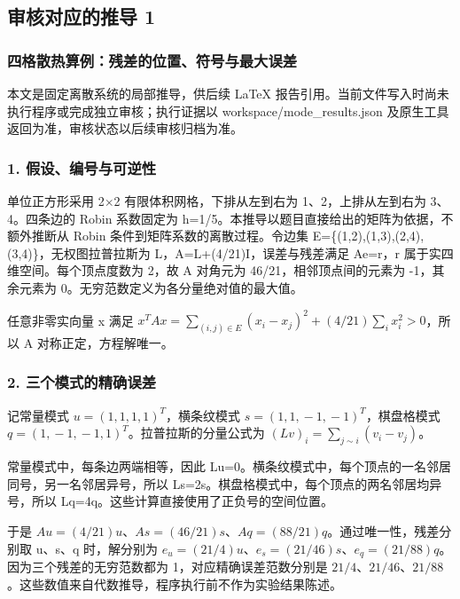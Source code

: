 \documentclass[UTF8,a4paper,11pt]{ctexart}
\begin{document}
\subsection*{审核对应的推导 1}
\subsubsection*{四格散热算例：残差的位置、符号与最大误差}

本文是固定离散系统的局部推导，供后续 LaTeX 报告引用。当前文件写入时尚未执行程序或完成独立审核；执行证据以 workspace/mode\_results.json 及原生工具返回为准，审核状态以后续审核归档为准。

\subsubsection*{1. 假设、编号与可逆性}

单位正方形采用 2\ensuremath{\times }2 有限体积网格，下排从左到右为 1、2，上排从左到右为 3、4。四条边的 Robin 系数固定为 h=1/5。本推导以题目直接给出的矩阵为依据，不额外推断从 Robin 条件到矩阵系数的离散过程。令边集 E=\{(1,2),(1,3),(2,4),(3,4)\}，无权图拉普拉斯为 L，A=L+(4/21)I，误差与残差满足 Ae=r，r 属于实四维空间。每个顶点度数为 2，故 A 对角元为 46/21，相邻顶点间的元素为 -1，其余元素为 0。无穷范数定义为各分量绝对值的最大值。

任意非零实向量 x 满足 \(x^T A x=\sum_{(i,\allowbreak{}j)\in E}(x_i-x_j)^2+(4/21)\sum_i x_i^2>0\)，所以 A 对称正定，方程解唯一。

\subsubsection*{2. 三个模式的精确误差}

记常量模式 \(u=(1,\allowbreak{}1,\allowbreak{}1,\allowbreak{}1)^T\)，横条纹模式 \(s=(1,\allowbreak{}1,\allowbreak{}-1,\allowbreak{}-1)^T\)，棋盘格模式 \(q=(1,\allowbreak{}-1,\allowbreak{}-1,\allowbreak{}1)^T\)。拉普拉斯的分量公式为 \((Lv)_i=\sum_{j\sim i}(v_i-v_j)\)。

常量模式中，每条边两端相等，因此 Lu=0。横条纹模式中，每个顶点的一名邻居同号，另一名邻居异号，所以 Ls=2s。棋盘格模式中，每个顶点的两名邻居均异号，所以 Lq=4q。这些计算直接使用了正负号的空间位置。

于是 \(Au=(4/21)u\)、\(As=(46/21)s\)、\(Aq=(88/21)q\)。通过唯一性，残差分别取 u、s、q 时，解分别为 \(e_u=(21/4)u\)、\(e_s=(21/46)s\)、\(e_q=(21/88)q\)。因为三个残差的无穷范数都为 1，对应精确误差范数分别是 \(21/4\)、\(21/46\)、\(21/88\)。这些数值来自代数推导，程序执行前不作为实验结果陈述。
\end{document}
